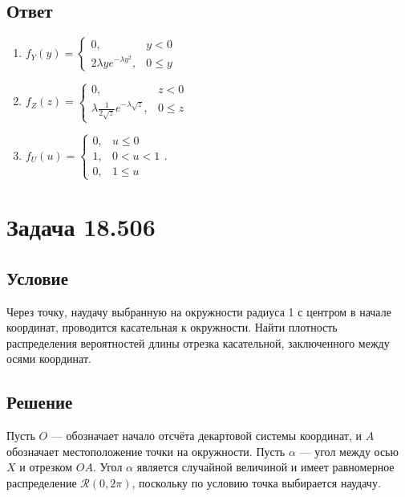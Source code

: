 \subsection*{Ответ}
\begin{enumerate}
    \item
    $
    f_Y(y)
    = \left \{
    \begin{array}{ll}
        0 ,                            & y < 0   \\
        2 \lambda y e^{- \lambda y^2}, & 0 \le y
    \end{array}
    \right .
    $
    \item
    $
    f_Z(z)
    = \left \{
    \begin{array}{ll}
        0,                                                   & z < 0   \\
        \lambda \frac{1}{2 \sqrt{z}} e^{- \lambda \sqrt{z}}, & 0 \le z
    \end{array}
    \right .
    $
    \item
    $
    f_U(u)
    = \left \{
    \begin{array}{ll}
        0,  & u \le 0   \\
        1 , & 0 < u < 1 \\
        0,  & 1 \le u
    \end{array}
    \right .
    .
    $
\end{enumerate}


\section*{Задача 18.506}
\subsection*{Условие}
Через точку, наудачу выбранную на окружности радиуса 1 с центром в начале координат, проводится касательная к окружности. Найти плотность распределения вероятностей
длины отрезка касательной, заключенного между осями координат.

\subsection*{Решение}
Пусть $O$ --- обозначает начало отсчёта декартовой системы координат, и $A$ обозначает местоположение точки на окружности. Пусть $\alpha$ --- угол между осью $X$ и
отрезком $OA$. Угол $\alpha$ является случайной величиной и имеет равномерное распределение $\mathcal{R}(0, 2 \pi)$, поскольку по условию точка выбирается наудачу.

